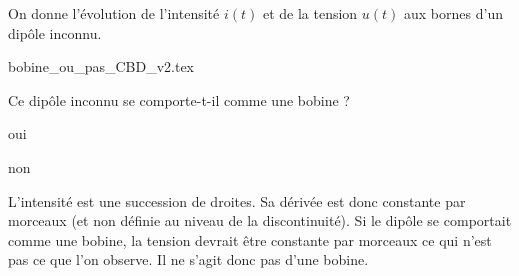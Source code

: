 
\hauteurLargeurCadreReponse		{6mm}{2.5cm}
\initialisationEntrainement

On donne l'évolution de l'intensité $i(t)$ et de la tension $u(t)$ aux bornes d'un dipôle inconnu.

\begin{center}
{bobine_ou_pas_CBD_v2.tex}
\end{center}

\debutEntrainement


\begin{enonce}
Ce dipôle inconnu se comporte-t-il comme une bobine ?
\begin{listeQCM2Colonnes}
\item oui
\item non
\end{listeQCM2Colonnes}
\end{enonce}

\reponse{\reponseB{}}  
  
\begin{corrige}
L'intensité est une succession de droites. Sa dérivée est donc constante par morceaux (et non définie au niveau de la discontinuité). Si le dipôle se comportait comme une bobine, la tension devrait être constante par morceaux ce qui n'est pas ce que l'on observe. Il ne s'agit donc pas d'une bobine.
\end{corrige}


\finEntrainement



